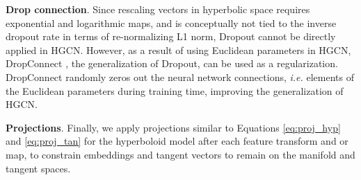 \documentclass{article}
\newcommand{\xhdr}[1]{{\noindent\bfseries #1}.}
\newcommand{\name}{\textsc{HGCN}\xspace}
\newcommand{\cut}[1]{}
\begin{document}
\xhdr{Drop connection}
Since rescaling vectors in hyperbolic space requires exponential and logarithmic maps, and is conceptually not tied to the inverse dropout rate in terms of re-normalizing L1 norm, Dropout cannot be directly applied in \name.
However, as a result of using Euclidean parameters in \name, DropConnect \cite{wan2013regularization}, the generalization of Dropout, can be used as a regularization. DropConnect randomly zeros out the neural network connections, \emph{i.e.} elements of the Euclidean parameters during training time, improving the generalization of \name.



\xhdr{Projections}
Finally, we apply projections similar to Equations \ref{eq:proj_hyp} and \ref{eq:proj_tan} for the hyperboloid model  after each feature transform and  or  map, to constrain embeddings and tangent vectors to remain on the manifold and tangent spaces.

\cut{Trainable curvature also provides a way to skip otherwise bad local minima in optimization.
In Figure \ref{fig:sweep_c} we observe that the curve of performance against curvature has fluctuations, despite theoretically equivalent local minima, suggesting that suboptimal local minima are reached for some curvatures. 
Training the curvature jointly with \name allows effective escape of local minima during optimization.
\subsection{Visualization}
\begin{figure}[t]
    \centering
    \begin{subfigure}[b]{0.24\textwidth}
        \texttt{[image: figs/HGCN\_attention\_1.png]}
        \label{fig:hgcn_att_1}
    \end{subfigure}
    \begin{subfigure}[b]{0.24\textwidth}
        \texttt{[image: figs/GAT\_attention\_1.png]}
        \label{fig:hgcn_att_2}
    \end{subfigure}
    \begin{subfigure}[b]{0.24\textwidth}
        \texttt{[image: figs/HGCN\_attention\_2.png]}
        \label{fig:gat_att_1}
    \end{subfigure}
    \begin{subfigure}[b]{0.24\textwidth}
        \texttt{[image: figs/GAT\_attention\_2.png]}
    \label{fig:gat_att_2}
    \end{subfigure}
    \caption{Each graph represents a 2-hop neighborhood of the \textbf{\textsc{Disease-M.}} dataset. The red node is the node where we compute attention for. The darkness of the color for other nodes denote their hierarchy. The attention weights for nodes in neighborhood with respect to the red node are visualized by the intensity of edges, and the ligher the edge is, the less attention weight. .}
    \label{fig:att_weights_appendix}
\end{figure}
} 


\end{document}
